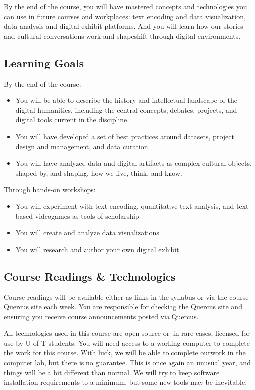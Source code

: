 \documentclass[11pt]{article}
\begin{document}
By the end of the course, you will have mastered concepts and technologies you can use in future courses and workplaces:  text encoding and data visualization, data analysis and digital exhibit platforms. And you will learn how our stories and cultural conversations work and shapeshift through digital environments.

\subsection*{Learning Goals}
\label{sec:org30fe9e4}
By the end of the course:

\begin{itemize}
\item You will be able to describe the history and intellectual landscape of the digital humanities, including the central concepts, debates, projects, and digital tools current in the discipline.
\item You will have developed a set of best practices around datasets, project design and management, and data curation.
\item You will have analyzed data and digital artifacts as complex cultural objects, shaped by, and shaping, how we live, think, and know.
\end{itemize}

Through hands-on workshops:
\begin{itemize}
\item You will experiment with text encoding, quantitative text analysis, and text-based videogames as tools of scholarship
\item You will create and analyze data visualizations
\item You will research and author your own digital exhibit
\end{itemize}

\subsection*{Course Readings \& Technologies}
\label{sec:org9bf36bd}
Course readings will be available either as links in the syllabus or via the course Quercus site each week. You are responsible for checking the Quercus site and ensuring you receive course announcements posted via Quercus.

All technologies used in this course are open-source or, in rare cases, licensed for use by U of T students. You will need access to a working computer to complete the work for this course. With luck, we will be able to complete ourwork in the computer lab, but there is no guarantee. This is once again an unusual year, and things will be a bit different than normal. We will try to keep software installation requirements to a minimum, but some new tools may be inevitable. 
\end{document}
